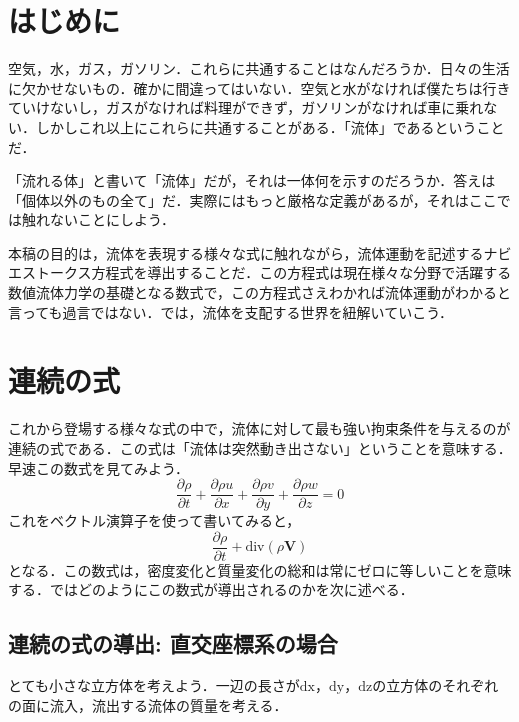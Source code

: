 \documentclass{jsarticle}
\newcommand{\pfrac}[2]{\frac{\partial{}{#1}}{\partial{}{#2}}}
\begin{document}
\section{はじめに}
空気，水，ガス，ガソリン．これらに共通することはなんだろうか．日々の生活に欠かせないもの．確かに間違ってはいない．空気と水がなければ僕たちは行きていけないし，ガスがなければ料理ができず，ガソリンがなければ車に乗れない．しかしこれ以上にこれらに共通することがある．「流体」であるということだ．

「流れる体」と書いて「流体」だが，それは一体何を示すのだろうか．答えは「個体以外のもの全て」だ．実際にはもっと厳格な定義があるが，それはここでは触れないことにしよう．

本稿の目的は，流体を表現する様々な式に触れながら，流体運動を記述するナビエストークス方程式を導出することだ．この方程式は現在様々な分野で活躍する数値流体力学の基礎となる数式で，この方程式さえわかれば流体運動がわかると言っても過言ではない．では，流体を支配する世界を紐解いていこう．

\section{連続の式}
これから登場する様々な式の中で，流体に対して最も強い拘束条件を与えるのが連続の式である．この式は「流体は突然動き出さない」ということを意味する．早速この数式を見てみよう．
\begin{equation}
  \pfrac{\rho}{t}+\pfrac{\rho{}u}{x}+\pfrac{\rho{}v}{y}+\pfrac{\rho{}w}{z}=0
\end{equation}
これをベクトル演算子を使って書いてみると，
\begin{equation}
  \pfrac{\rho}{t}+\mathrm{div}(\rho\bm{V})
\end{equation}
となる．この数式は，密度変化と質量変化の総和は常にゼロに等しいことを意味する．ではどのようにこの数式が導出されるのかを次に述べる．
\subsection{連続の式の導出: 直交座標系の場合}
とても小さな立方体を考えよう．一辺の長さが$\mathrm{dx}$，$\mathrm{dy}$，$\mathrm{dz}$の立方体のそれぞれの面に流入，流出する流体の質量を考える．
\end{document}
